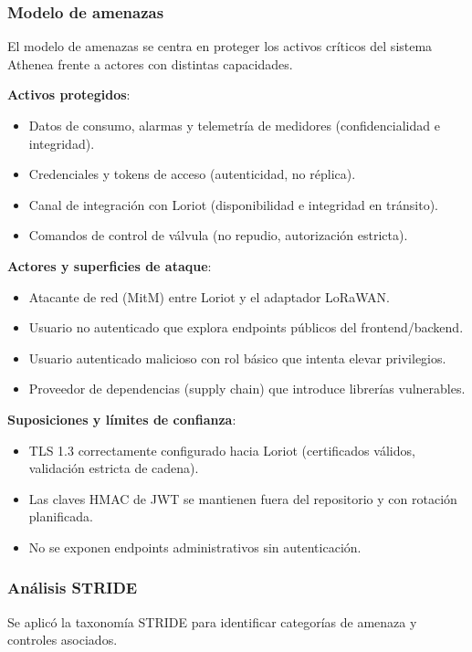 \documentclass[12pt,a4paper,oneside]{report}
\begin{document}
\subsubsection{Modelo de amenazas}

El modelo de amenazas se centra en proteger los activos críticos del sistema Athenea frente a actores con distintas capacidades.

\textbf{Activos protegidos}:
\begin{itemize}
  \item Datos de consumo, alarmas y telemetría de medidores (confidencialidad e integridad).
  \item Credenciales y tokens de acceso (autenticidad, no réplica).
  \item Canal de integración con Loriot (disponibilidad e integridad en tránsito).
  \item Comandos de control de válvula (no repudio, autorización estricta).
\end{itemize}

\textbf{Actores y superficies de ataque}:
\begin{itemize}
  \item Atacante de red (MitM) entre Loriot y el adaptador LoRaWAN.
  \item Usuario no autenticado que explora endpoints públicos del frontend/backend.
  \item Usuario autenticado malicioso con rol básico que intenta elevar privilegios.
  \item Proveedor de dependencias (supply chain) que introduce librerías vulnerables.
\end{itemize}

\textbf{Suposiciones y límites de confianza}:
\begin{itemize}
  \item TLS 1.3 correctamente configurado hacia Loriot (certificados válidos, validación estricta de cadena).
  \item Las claves HMAC de JWT se mantienen fuera del repositorio y con rotación planificada.
  \item No se exponen endpoints administrativos sin autenticación.
\end{itemize}

\subsubsection{Análisis STRIDE}

Se aplicó la taxonomía STRIDE para identificar categorías de amenaza y controles asociados.
\end{document}
